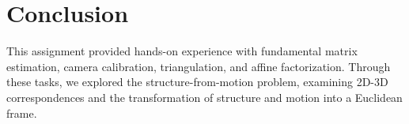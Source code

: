 {\section{Conclusion}
This assignment provided hands-on experience with fundamental matrix estimation, camera calibration, triangulation, and affine factorization. Through these tasks, we explored the structure-from-motion problem, examining 2D-3D correspondences and the transformation of structure and motion into a Euclidean frame.

} 